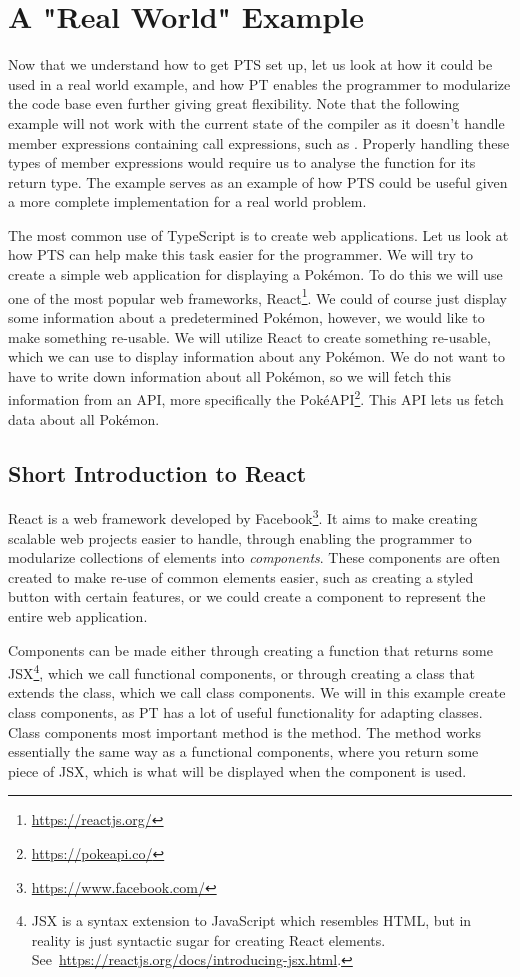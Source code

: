 \section{A "Real World" Example}\label{sec:a-real-world-example}

Now that we understand how to get PTS set up, let us look at how it could be used in a real world example, and how PT enables the programmer to modularize the code base even further giving great flexibility.
Note that the following example will not work with the current state of the compiler as it doesn't handle member expressions containing call expressions, such as .
Properly handling these types of member expressions would require us to analyse the function for its return type.
The example serves as an example of how PTS could be useful given a more complete implementation for a real world problem.

The most common use of TypeScript is to create web applications.
Let us look at how PTS can help make this task easier for the programmer.
We will try to create a simple web application for displaying a Pokémon.
To do this we will use one of the most popular web frameworks, React\footnote{\url{https://reactjs.org/}}.
We could of course just display some information about a predetermined Pokémon, however, we would like to make something re-usable.
We will utilize React to create something re-usable, which we can use to display information about any Pokémon.
We do not want to have to write down information about all Pokémon, so we will fetch this information from an API, more specifically the PokéAPI\footnote{\url{https://pokeapi.co/}}.
This API lets us fetch data about all Pokémon.

\subsection{Short Introduction to React}\label{subsec:short-introduction-to-react}

React is a web framework developed by Facebook\footnote{\url{https://www.facebook.com/}}.
It aims to make creating scalable web projects easier to handle, through enabling the programmer to modularize collections of elements into \emph{components}.
These components are often created to make re-use of common elements easier, such as creating a styled button with certain features, or we could create a component to represent the entire web application.

Components can be made either through creating a function that returns some JSX\footnote{JSX is a syntax extension to JavaScript which resembles HTML, but in reality is just syntactic sugar for creating React elements. See~\url{https://reactjs.org/docs/introducing-jsx.html}.}, which we call functional components, or through creating a class that extends the  class, which we call class components.
We will in this example create class components, as PT has a lot of useful functionality for adapting classes.
Class components most important method is the  method.
The  method works essentially the same way as a functional components, where you return some piece of JSX, which is what will be displayed when the component is used.

